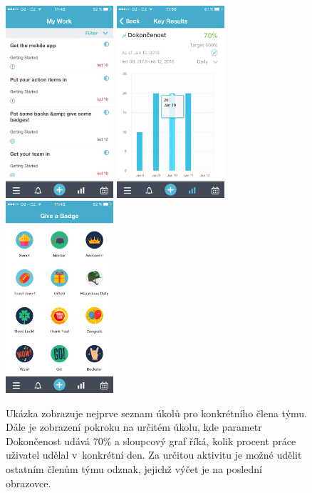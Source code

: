 \begin{figure}[H]
\centering
\includegraphics[width= 4cm]{obrazky-figures/IMG_0344}
\includegraphics[width= 4cm]{obrazky-figures/IMG_0346}
\includegraphics[width= 4cm]{obrazky-figures/IMG_0343}
\caption{Ukázka zobrazuje nejprve seznam úkolů pro konkrétního člena týmu. Dále je zobrazení pokroku na určitém úkolu, kde parametr Dokončenost udává 70\% a sloupcový graf říká, kolik procent práce uživatel udělal v~konkrétní den. Za určitou aktivitu je možné udělit ostatním členům týmu odznak, jejichž výčet je na poslední obrazovce. }
\label{work}
\end{figure}

